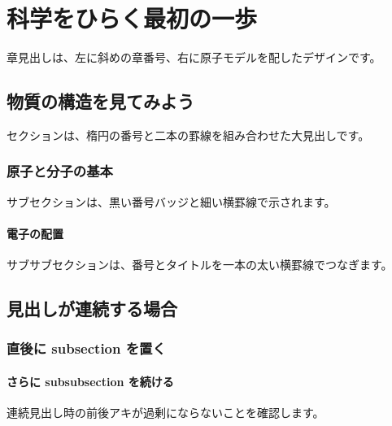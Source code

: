 \documentclass[b5paper,11pt]{ltjsbook}
\begin{document}
\chapter{科学をひらく最初の一歩}

章見出しは、左に斜めの章番号、右に原子モデルを配したデザインです。

\section{物質の構造を見てみよう}

セクションは、楕円の番号と二本の罫線を組み合わせた大見出しです。

\subsection{原子と分子の基本}

サブセクションは、黒い番号バッジと細い横罫線で示されます。

\subsubsection{電子の配置}

サブサブセクションは、番号とタイトルを一本の太い横罫線でつなぎます。

\section{見出しが連続する場合}
\subsection{直後に subsection を置く}
\subsubsection{さらに subsubsection を続ける}

連続見出し時の前後アキが過剰にならないことを確認します。
\end{document}
